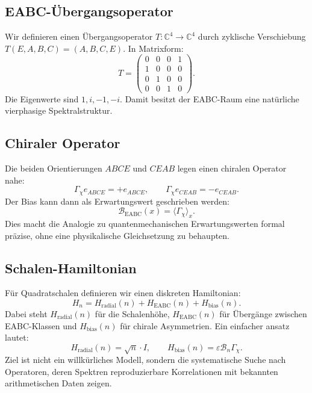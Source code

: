 \documentclass[11pt,a4paper,bibliography=totoc]{scrartcl}
\begin{document}
	\subsection{EABC-Übergangsoperator}
	Wir definieren einen Übergangsoperator $T : \mathbb{C}^4 \to \mathbb{C}^4$ durch zyklische Verschiebung $T(E,A,B,C) = (A,B,C,E)$. In Matrixform:
	\[
	T = \begin{pmatrix}
		0 & 0 & 0 & 1 \\
		1 & 0 & 0 & 0 \\
		0 & 1 & 0 & 0 \\
		0 & 0 & 1 & 0
	\end{pmatrix}.
	\]
	Die Eigenwerte sind $1, i, -1, -i$. Damit besitzt der EABC-Raum eine natürliche vierphasige Spektralstruktur.
	
	\subsection{Chiraler Operator}
	Die beiden Orientierungen $ABCE$ und $CEAB$ legen einen chiralen Operator nahe:
	\[
	\Gamma_{\chi} e_{ABCE} = +e_{ABCE}, \qquad \Gamma_{\chi} e_{CEAB} = -e_{CEAB}.
	\]
	Der Bias kann dann als Erwartungswert geschrieben werden:
	\[
	\mathcal{B}_{\mathrm{EABC}}(x) = \langle \Gamma_{\chi} \rangle_x.
	\]
	Dies macht die Analogie zu quantenmechanischen Erwartungswerten formal präzise, ohne eine physikalische Gleichsetzung zu behaupten.
	
	\subsection{Schalen-Hamiltonian}
	Für Quadratschalen definieren wir einen diskreten Hamiltonian:
	\[
	H_n = H_{\mathrm{radial}}(n) + H_{\mathrm{EABC}}(n) + H_{\mathrm{bias}}(n).
	\]
	Dabei steht $H_{\mathrm{radial}}(n)$ für die Schalenhöhe, $H_{\mathrm{EABC}}(n)$ für Übergänge zwischen EABC-Klassen und $H_{\mathrm{bias}}(n)$ für chirale Asymmetrien. Ein einfacher ansatz lautet:
	\[
	H_{\mathrm{radial}}(n) = \sqrt{n} \cdot I, \qquad H_{\mathrm{bias}}(n) = \varepsilon \mathcal{B}_n \Gamma_{\chi}.
	\]
	Ziel ist nicht ein willkürliches Modell, sondern die systematische Suche nach Operatoren, deren Spektren reproduzierbare Korrelationen mit bekannten arithmetischen Daten zeigen.
	
\end{document}
